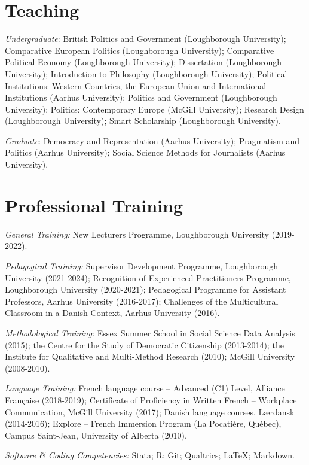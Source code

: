 \documentclass[letterpaper,fontsize=10.5pt]{scrartcl}
\begin{document}
\section{Teaching}
{}\textit{Undergraduate}: British Politics and Government (Loughborough University); Comparative European Politics (Loughborough University); Comparative Political Economy (Loughborough University); Dissertation (Loughborough University); Introduction to Philosophy (Loughborough University); Political Institutions: Western Countries, the European Union and International Institutions (Aarhus University); Politics and Government (Loughborough University); Politics: Contemporary Europe (McGill University); Research Design (Loughborough University); Smart Scholarship (Loughborough University).\\
\hfill \break
{}
{}\textit{Graduate}: Democracy and Representation (Aarhus University); Pragmatism and Politics (Aarhus University); Social Science Methods for Journalists (Aarhus University).

\section{Professional Training}
{}\textit{General Training:} New Lecturers Programme, Loughborough University (2019-2022).\\
\hfill \break
{}
{}\textit{Pedagogical Training:} Supervisor Development Programme, Loughborough University (2021-2024); Recognition of Experienced Practitioners Programme, Loughborough University (2020-2021); Pedagogical Programme for Assistant Professors, Aarhus University (2016-2017); Challenges of the Multicultural Classroom in a Danish Context, Aarhus University (2016).\\
\hfill \break
{}
{}\textit{Methodological Training:} Essex Summer School in Social Science Data Analysis (2015); the Centre for the Study of Democratic Citizenship (2013-2014); the Institute for Qualitative and Multi-Method Research (2010); McGill University (2008-2010).\\
\hfill \break
{}
{}\textit{Language Training:} French language course – Advanced (C1) Level, Alliance Française (2018-2019); Certificate of Proficiency in Written French – Workplace Communication, McGill University (2017); Danish language courses, Lærdansk (2014-2016); Explore – French Immersion Program (La Pocatière, Québec), Campus Saint-Jean, University of Alberta (2010).\\
\hfill \break
{}
{}\textit{Software \& Coding Competencies:} Stata; R; Git; Qualtrics; \LaTeX ; Markdown.
\end{document}
